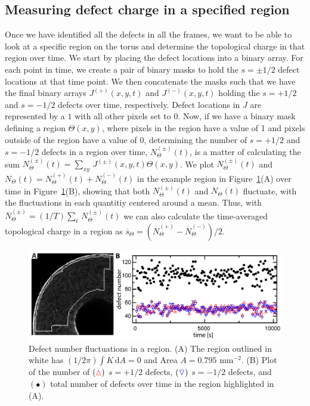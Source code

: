 \subsection{Measuring defect charge in a specified region}
Once we have identified all the defects in all the frames, we want to be able to look at a specific region on the torus and determine the topological charge in that region over time.
We start by placing the defect locations into a binary array.
For each point in time, we create a pair of binary masks to hold the $s = \pm 1/2$ defect locations at that time point.
We then concatenate the masks such that we have the final binary arrays $J^{(+)}(x,y,t)$ and $J^{(-)}(x,y,t)$ holding the $s = +1/2$ and $s = -1/2$ defects over time, respectively.
Defect locations in $J$ are represented by a $1$ with all other pixels set to $0$.
Now, if we have a binary mask defining a region $\Theta(x,y)$, where pixels in the region have a value of 1 and pixels outside of the region have a value of $0$, determining the number of $s = +1/2$ and $s = -1/2$ defects in a region over time, $N^{(\pm)}_{\Theta}(t)$, is a matter of calculating the sum $N^{(\pm)}_{\Theta}(t) = \sum\limits_{xy}\,J^{(\pm)}(x,y,t)\Theta(x,y)$.
We plot $N^{(\pm)}_{\Theta}(t)$ and $N_{\Theta}(t) = N^{(+)}_{\Theta}(t) + N^{(-)}_{\Theta}(t)$ in the example region in Figure~\ref{f:3-NumberOverTime}(A) over time in Figure~\ref{f:3-NumberOverTime}(B), showing that both $N^{(\pm)}_{\Theta}(t)$ and $N_{\Theta}(t)$ fluctuate, with the fluctuations in each quantitiy centered around a mean.
Thus, with $\overbar{N}^{(\pm)}_{\Theta} = (1/T)\sum\limits_t \, N^{(\pm)}_{\Theta}(t)$ we can also calculate the time-averaged topological charge in a region as $\overbar{s}_{\Theta} = (\overbar{N}^{(+)}_{\Theta} - \overbar{N}^{(-)}_{\Theta})/2$.
\begin{figure}
  \centering
  \includegraphics{figures/C3/Ch3-Figs_NumberOverTime.png}
  \caption{Defect number fluctuations in a region.
  (A) The region outlined in white has $(1/2\pi)\int K\, \textrm{d}A = 0$ and Area $A = 0.795$ mm$^{-2}$.
  (B) Plot of the number of $({\color{red} \vartriangle})$ $s = + 1/2$ defects, $({\color{blue} \triangledown})$ $s = -1/2$ defects, and $(\bullet)$ total number of defects over time in the region highlighted in (A).}\label{f:3-NumberOverTime}
\end{figure}

